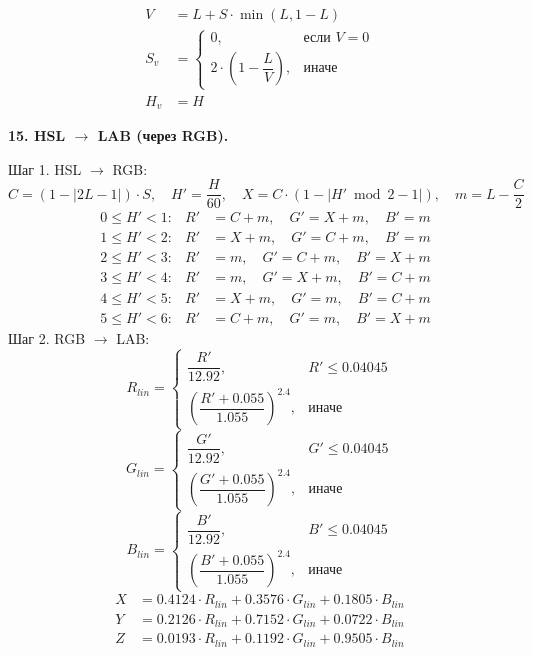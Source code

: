 \documentclass[12pt,a4paper]{article}
\begin{document}
\begin{align*}
V &= L + S \cdot \min(L, 1 - L) \\
S_v &= \begin{cases} 0, & \text{если } V = 0 \\[8pt] 2 \cdot \left( 1 - \dfrac{L}{V} \right), & \text{иначе} \end{cases} \\
H_v &= H
\end{align*}

\textbf{15. HSL \(\to\) LAB (через RGB).}

Шаг 1. HSL \(\to\) RGB:
\[
C = (1 - |2L - 1|) \cdot S,\quad H' = \frac{H}{60},\quad X = C \cdot (1 - |H' \bmod 2 - 1|),\quad m = L - \frac{C}{2}
\]
\begin{align*}
&0 \le H' < 1: & R' &= C + m,\quad G' = X + m,\quad B' = m \\
&1 \le H' < 2: & R' &= X + m,\quad G' = C + m,\quad B' = m \\
&2 \le H' < 3: & R' &= m,\quad G' = C + m,\quad B' = X + m \\
&3 \le H' < 4: & R' &= m,\quad G' = X + m,\quad B' = C + m \\
&4 \le H' < 5: & R' &= X + m,\quad G' = m,\quad B' = C + m \\
&5 \le H' < 6: & R' &= C + m,\quad G' = m,\quad B' = X + m
\end{align*}
Шаг 2. RGB \(\to\) LAB:
\[
R_{lin} = \begin{cases} \dfrac{R'}{12.92}, & R' \le 0.04045 \\[8pt] \left( \dfrac{R' + 0.055}{1.055} \right)^{2.4}, & \text{иначе} \end{cases}
\]
\[
G_{lin} = \begin{cases} \dfrac{G'}{12.92}, & G' \le 0.04045 \\[8pt] \left( \dfrac{G' + 0.055}{1.055} \right)^{2.4}, & \text{иначе} \end{cases}
\]
\[
B_{lin} = \begin{cases} \dfrac{B'}{12.92}, & B' \le 0.04045 \\[8pt] \left( \dfrac{B' + 0.055}{1.055} \right)^{2.4}, & \text{иначе} \end{cases}
\]
\begin{align*}
X &= 0.4124 \cdot R_{lin} + 0.3576 \cdot G_{lin} + 0.1805 \cdot B_{lin} \\
Y &= 0.2126 \cdot R_{lin} + 0.7152 \cdot G_{lin} + 0.0722 \cdot B_{lin} \\
Z &= 0.0193 \cdot R_{lin} + 0.1192 \cdot G_{lin} + 0.9505 \cdot B_{lin}
\end{align*}
\end{document}
